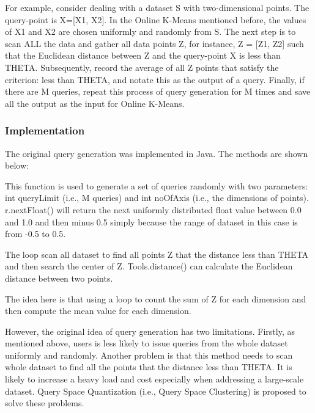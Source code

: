 \documentclass{lmproj}
\begin{document}
For example, consider dealing with a dataset S with two-dimensional points. The query-point is X=[X1, X2]. In the Online K-Means mentioned before, the values of X1 and X2 are chosen uniformly and randomly from S. The next step is to scan ALL the data and gather all data points Z, for instance, Z = [Z1, Z2] such that the Euclidean distance between Z and the query-point X is less than THETA. Subsequently, record the average of all Z points that satisfy the criterion: less than THETA, and notate this as the output of a query. Finally, if there are M queries, repeat this process of query generation for M times and save all the output as the input for Online K-Means. 

\subsubsection{Implementation}
The original query generation was implemented in Java. The methods are shown below:



This function is used to generate a set of queries randomly with two parameters: int queryLimit (i.e., M queries) and int noOfAxis (i.e., the dimensions of points). r.nextFloat() will return the next uniformly distributed float value between 0.0 and 1.0 and then minus 0.5 simply because the range of dataset in this case is from -0.5 to 0.5.



The loop scan all dataset to find all points Z that the distance less than THETA and then search the center of Z. Tools.distance() can calculate the Euclidean distance between two points.

The idea here is that using a loop to count the sum of Z for each dimension and then compute the mean value for each dimension.

However, the original idea of query generation has two limitations. Firstly, as mentioned above, users is less likely to issue queries from the whole dataset uniformly and randomly. Another problem is that this method needs to scan whole dataset to find all the points that the distance less than THETA. It is likely to increase a heavy load and cost especially when addressing a large-scale dataset. Query Space Quantization (i.e., Query Space Clustering) is proposed to solve these problems. 
\end{document}
